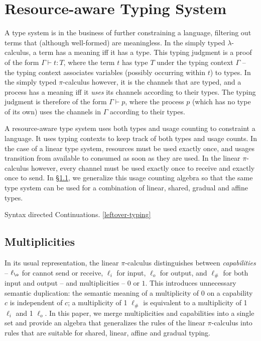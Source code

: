 \documentclass[a4paper,UKenglish,cleveref, autoref, thm-restate,authorcolumns]{lipics-v2019}
\newcommand{\lamcalc}{$\lambda$-calculus}
\newcommand{\picalc}{$\pi$-calculus}
\begin{document}
\section{Resource-aware Typing System}

A type system is in the business of further constraining a language, filtering out terms that (although well-formed) are meaningless.
In the simply typed \lamcalc{}, a term has a meaning iff it has a type.
This typing judgment is a proof of the form $\Gamma \vdash t : T$, where the term $t$ has type $T$ under the typing context $\Gamma$ -- the typing context associates variables (possibly occurring within $t$) to types.
In the simply typed \picalc{} however, it is the channels that are typed, and a process has a meaning iff it \emph{uses} its channels according to their types.
The typing judgment is therefore of the form $\Gamma \vdash p$, where the process $p$ (which has no type of its own) uses the channels in $\Gamma$ according to their types.

A resource-aware type system uses both types and usage counting to constraint a language.
It uses typing contexts to keep track of both types and usage counts.
In the case of a linear type system, resources must be used exactly once, and usages transition from available to consumed as soon as they are used.
In the linear \picalc{} however, every channel must be used exactly once to receive and exactly once to send.
In \S \ref{multiplicities}, we generalize this usage counting algebra so that the same type system can be used for a combination of linear, shared, gradual and affine types.


Syntax directed
Continuations.
\ref{leftover-typing}

\subsection{Multiplicities}\label{multiplicities}

In its usual representation, the linear \picalc{} distinguishes between \emph{capabilities} -- $\ell_{\o}$ for cannot send or receive, $\ell_i$ for input, $\ell_o$ for output, and $\ell_\#$ for both input and output -- and multiplicities -- $0$ or $1$.
This introduces unnecessary semantic duplication: the semantic meaning of a multiplicity of $0$ on a capability $c$ is independent of $c$; a multiplicity of 1 $\ell_\#$ is equivalent to a multiplicity of 1 $\ell_i$ and 1 $\ell_o$.
In this paper, we merge multiplicities and capabilities into a single set and provide an algebra that generalizes the rules of the linear \picalc{} into rules that are suitable for shared, linear, affine and gradual typing.
\end{document}
